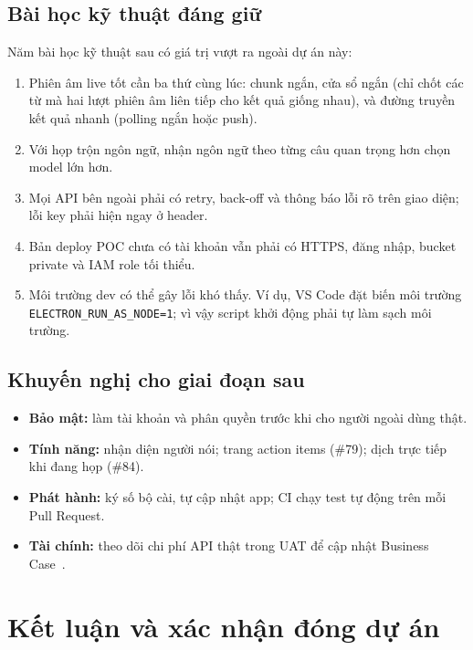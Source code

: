 \documentclass[12pt,a4paper]{report}
\begin{document}
\section{Bài học kỹ thuật đáng giữ}

Năm bài học kỹ thuật sau có giá trị vượt ra ngoài dự án này:
\begin{enumerate}
  \item Phiên âm live tốt cần ba thứ cùng lúc: chunk ngắn, cửa sổ ngắn (chỉ chốt các từ mà hai lượt phiên âm liên
        tiếp cho kết quả giống nhau), và đường truyền kết quả nhanh (polling ngắn hoặc push).
  \item Với họp trộn ngôn ngữ, nhận ngôn ngữ theo từng câu quan trọng hơn chọn model lớn hơn.
  \item Mọi API bên ngoài phải có retry, back-off và thông báo lỗi rõ trên giao diện; lỗi key phải hiện ngay ở header.
  \item Bản deploy POC chưa có tài khoản vẫn phải có HTTPS, đăng nhập, bucket private và IAM role tối thiểu.
  \item Môi trường dev có thể gây lỗi khó thấy. Ví dụ, VS Code đặt biến môi trường
        \texttt{ELECTRON\_RUN\_AS\_NODE=1}; vì vậy script khởi động phải tự làm sạch môi trường.
\end{enumerate}

\section{Khuyến nghị cho giai đoạn sau}

\begin{itemize}
  \item \textbf{Bảo mật:} làm tài khoản và phân quyền trước khi cho người ngoài dùng thật.
  \item \textbf{Tính năng:} nhận diện người nói; trang action items (\#79); dịch trực tiếp khi đang họp (\#84).
  \item \textbf{Phát hành:} ký số bộ cài, tự cập nhật app; CI chạy test tự động trên mỗi Pull Request.
  \item \textbf{Tài chính:} theo dõi chi phí API thật trong UAT để cập nhật Business Case~\cite{pid}.
\end{itemize}

\chapter{Kết luận và xác nhận đóng dự án}
\label{chap:conclusion}
\end{document}

